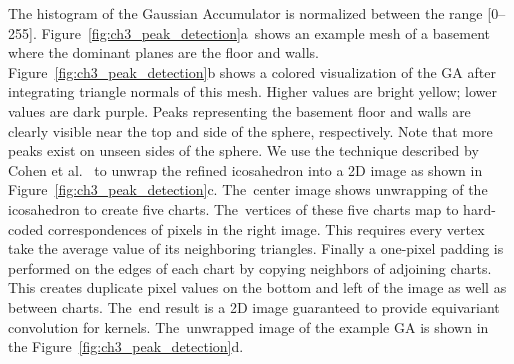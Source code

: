 The histogram of the Gaussian Accumulator is normalized between the range [0--255]. Figure~\ref{fig:ch3_peak_detection}a~shows an example mesh of a basement where the dominant planes are the floor and walls. Figure~\ref{fig:ch3_peak_detection}b shows a colored visualization of the GA after integrating triangle normals of this mesh. Higher values are bright yellow; lower values are dark purple. Peaks representing the basement floor and walls are clearly visible near the top and side of the sphere, respectively. Note that more peaks exist on unseen sides of the sphere. We use the technique described by Cohen et al.~\cite{cohen_gauge_2019} to unwrap the refined icosahedron into a 2D image as shown in Figure~\ref{fig:ch3_peak_detection}c.  The~center image shows unwrapping of the icosahedron to create  five charts. The~vertices of these five charts map to hard-coded correspondences of pixels in the right image. This requires every vertex take the average value of its neighboring triangles. Finally a one-pixel padding is performed on the edges of each chart by copying neighbors of adjoining charts. This creates duplicate pixel values on the bottom and left of the image as well as between charts. The~end result is a 2D image guaranteed to provide equivariant convolution for kernels. The~unwrapped image of the example GA is shown in the Figure~\ref{fig:ch3_peak_detection}d.  



